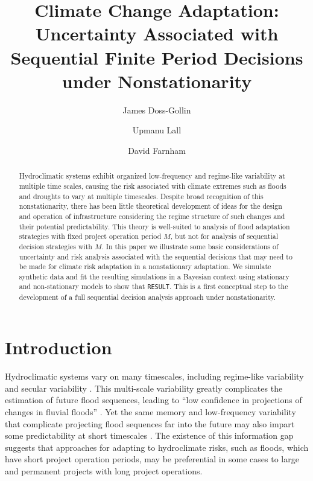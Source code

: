 \documentclass[11pt]{article}
\title{Climate Change Adaptation: Uncertainty Associated with Sequential Finite Period Decisions under Nonstationarity}
\author[1,2]{James Doss-Gollin}
\author[1,2]{Upmanu Lall}
\author[1,2]{David Farnham}
\affil[1]{Columbia Water Center, Columbia University}
\affil[2]{Department of Earth and Environmental Engineering, Columbia University}
\begin{document}
\maketitle

\begin{abstract}
  Hydroclimatic systems exhibit organized low-frequency and regime-like variability at multiple time scales, causing the risk associated with climate extremes such as floods and droughts to vary at multiple timescales.
  Despite broad recognition of this nonstationarity, there has been little theoretical development of ideas for the design and operation of infrastructure considering the regime structure of such changes and their potential predictability.
  This theory is well-suited to analysis of flood adaptation strategies with fixed project operation period $M$, but not for analysis of sequential decision strategies with $M$.
  In this paper we illustrate some basic considerations of uncertainty and risk analysis associated with the sequential decisions that may need to be made for climate risk adaptation in a nonstationary adaptation.
  We simulate synthetic data and fit the resulting simulations in a Bayesian context using stationary and non-stationary models to show that \texttt{RESULT}.
  This is a first conceptual step to the development of a full sequential decision analysis approach under nonstationarity.
\end{abstract}


\section{Introduction}

Hydroclimatic systems vary on many timescales, including regime-like variability and secular variability  \citep{Milly2008,Merz2014,Hurst1951,Sveinsson2005,Hodgkins2017,Matalas2012}.
This multi-scale variability greatly complicates the estimation of future flood sequences, leading to ``low confidence in projections of changes in fluvial floods'' \citep{IPCC2012}.
Yet the same memory and low-frequency variability that complicate projecting flood sequences far into the future may also impart some predictability at short timescales \citep{Jain2001}.
The existence of this information gap suggests that approaches for adapting to hydroclimate risks, such as floods, which have short project operation periods, may be preferential in some cases to large and permanent projects with long project operations.
\end{document}
